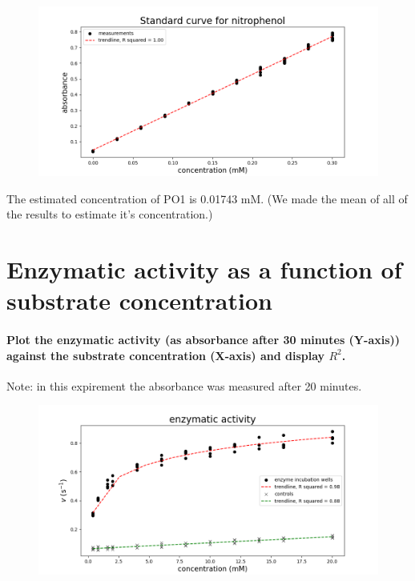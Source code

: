 \documentclass[a4paper,12pt]{article}
\begin{document}
\begin{figure}[htb]
    \includegraphics[scale=0.4]{fig1.png}
    \centering
\end{figure}

The estimated concentration of PO1 is 0.01743 mM. (We made the mean of all of the results to estimate it's concentration.)

\section{Enzymatic activity as a function of substrate concentration}

\paragraph{Plot the enzymatic activity (as absorbance after 30 minutes (Y-axis)) 
against the substrate concentration (X-axis) and display $R^2$.}

Note: in this expirement the absorbance was measured after 20 minutes.

\begin{figure}[htb]
    \includegraphics[scale=0.4]{fig2_1.png}
    \centering
\end{figure}
\end{document}
